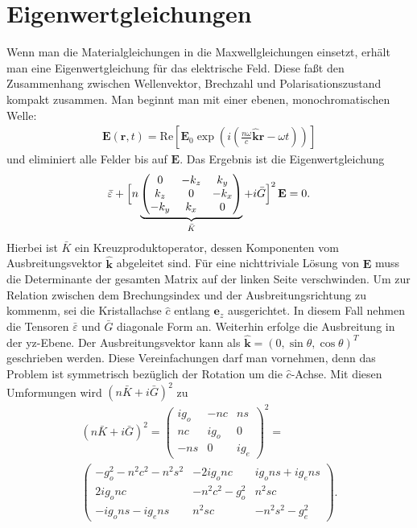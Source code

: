 \documentclass[twocolumn,10pt,DIV18]{scrartcl}
\renewcommand{\v}[1]{{\mathbf #1}} %
\newcommand{\T}[1]{{\bar #1}} %
\newcommand{\E}{\v E}
\newcommand{\eps}{\varepsilon}
\newcommand{\hk}{\hat{\v k}} %
\renewcommand{\r}{\v r}
\renewcommand{\[}{\left[}
\renewcommand{\]}{\right]}
\renewcommand{\(}{\left(}
\renewcommand{\)}{\right)}
\begin{document}
  \section{Eigenwertgleichungen}
  Wenn man die Materialgleichungen in die Maxwellgleichungen einsetzt,
  erh\"alt man eine Eigenwertgleichung f\"ur das elektrische
  Feld. Diese fa\ss t den Zusammenhang zwischen Wellenvektor,
  Brechzahl und Polarisationszustand kompakt zusammen. Man
  beginnt man mit einer ebenen, monochromatischen Welle:
  \begin{align}
    \E(\r,t)=\textrm{Re}\[\E_0\exp\(i\(\frac{n\omega}{c}\hk\r-\omega t\)\)\]
  \end{align}
  und eliminiert alle Felder bis auf $\E$.  Das Ergebnis ist die
  Eigenwertgleichung
  \begin{align}
    \T\eps+\Bigl[n\underbrace{\begin{pmatrix}0&-k_z&k_y\\
    k_z&0&-k_x\\
    -k_y&k_x&0\end{pmatrix}}_{\T K}+i\T G\Bigr]^2\,\E=0.
  \end{align}
  Hierbei ist $\T K$ ein Kreuzproduktoperator, dessen Komponenten vom
  Ausbreitungsvektor $\hk$ abgeleitet sind.  F\"ur eine nichttriviale
  L\"osung von $\E$ muss die Determinante der gesamten Matrix auf der
  linken Seite verschwinden. Um zur Relation zwischen dem
  Brechungsindex und der Ausbreitungsrichtung zu kommenm, sei die
  Kristallachse $\hat c$ entlang $\v e_z$ ausgerichtet. In diesem Fall
  nehmen die Tensoren $\T\eps$ und $\T G$ diagonale Form an.
  Weiterhin erfolge die Ausbreitung in der yz-Ebene. Der
  Ausbreitungsvektor kann als $\hk=(0,\sin\theta,\cos\theta)^T$
  geschrieben werden. Diese Vereinfachungen darf man vornehmen, denn
  das Problem ist symmetrisch bez\"uglich der Rotation um die $\hat
  c$-Achse. Mit diesen Umformungen wird $(n\T K+i\T G)^2$ zu
  \begin{align*}
    (n\T K+i\T G)^2=
    \begin{pmatrix}
      i g_o      &         -nc         &       ns       \\
      nc          &      i g_o         &       0       \\
      -ns         &         0          &     i g_e 
    \end{pmatrix}^2=\\
    \begin{pmatrix}
      -g_o^2-n^2c^2-n^2s^2  &  -2ig_onc     &  ig_ons+ig_ens \\
      2ig_onc               & -n^2c^2-g_o^2 & n^2sc \\
      -ig_ons-ig_ens        & n^2sc         & -n^2s^2-g_e^2
    \end{pmatrix}.
  \end{align*}
\end{document}
